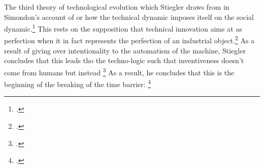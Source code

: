 \documentclass[letterpaper,notitlepage,12pt]{article}
\begin{document}
The third theory of technological evolution which Stiegler draws from in
Simondon's account of  or how the technical dynamic
imposes itself on the social dynamic.\footcite[p. 67]{stiegler_technics_1998}
This rests on the supposition that technical innovation aims at
 as perfection when it in fact represents the perfection
of an industrial object.\footcite[p. 66]{stiegler_technics_1998}
As a result of giving over intentionality to the automatism of the machine,
Stiegler concludes that this leads tho the techno-logic such that inventiveness
doesn't come from humans but instead \footcite[p. 68]{stiegler_technics_1998}
As a result, he concludes that this is the beginning of the breaking of the time
barrier: \footcite[p. 69]{stiegler_technics_1998}
\end{document}
